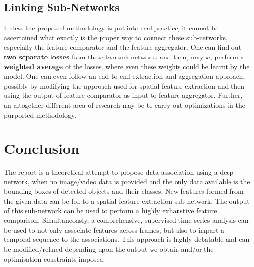 \documentclass[a4paper]{article}
\begin{document}
    \subsection{Linking Sub-Networks}
    Unless the proposed methodology is put into real practice, it cannot be ascertained what exactly is the proper way to connect these sub-networks, especially the feature comparator and the feature aggregator. One can find out \textbf{two separate losses} from these two sub-networks and then, maybe, perform a \textbf{weighted average} of the losses, where even these weights could be learnt by the model. One can even follow an end-to-end extraction and aggregation approach, possibly by modifying the approach used for spatial feature extraction and then using the output of feature comparator as input to feature aggregator. Further, an altogether different area of research may be to carry out optimizations in the purported methodology.

\section{Conclusion}
    The report is a theoretical attempt to propose data association using a deep network, when no image/video data is provided and the only data available is the bounding boxes of detected objects and their classes. New features formed from the given data can be fed to a spatial feature extraction sub-network. The output of this sub-network can be used to perform a highly exhaustive feature comparison. Simultaneously, a comprehensive, supervised time-series analysis can be used to not only associate features across frames, but also to impart a temporal sequence to the associations. This approach is highly debatable and can be modified/refined depending upon the output we obtain and/or the optimisation constraints imposed. 

 


\end{document}
